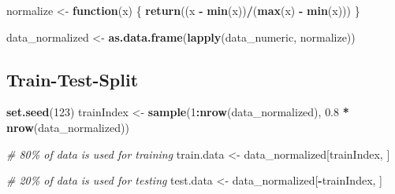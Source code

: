 \documentclass[
  10pt,
  paper=a4,
  ,captions=tableheading
]{scrartcl}
\newenvironment{Shaded}{\begin{snugshade}}{\end{snugshade}}
\newcommand{\CommentTok}[1]{\textcolor[rgb]{0.56,0.35,0.01}{\textit{#1}}}
\newcommand{\ControlFlowTok}[1]{\textcolor[rgb]{0.13,0.29,0.53}{\textbf{#1}}}
\newcommand{\DecValTok}[1]{\textcolor[rgb]{0.00,0.00,0.81}{#1}}
\newcommand{\FloatTok}[1]{\textcolor[rgb]{0.00,0.00,0.81}{#1}}
\newcommand{\FunctionTok}[1]{\textcolor[rgb]{0.13,0.29,0.53}{\textbf{#1}}}
\newcommand{\NormalTok}[1]{#1}
\newcommand{\OtherTok}[1]{\textcolor[rgb]{0.56,0.35,0.01}{#1}}
\newcommand{\SpecialCharTok}[1]{\textcolor[rgb]{0.81,0.36,0.00}{\textbf{#1}}}
\newcommand{\StringTok}[1]{\textcolor[rgb]{0.31,0.60,0.02}{#1}}
\begin{document}
\begin{Shaded}
\begin{Highlighting}[]
\NormalTok{normalize }\OtherTok{\textless{}{-}} \ControlFlowTok{function}\NormalTok{(x) \{}
    \FunctionTok{return}\NormalTok{((x }\SpecialCharTok{{-}} \FunctionTok{min}\NormalTok{(x))}\SpecialCharTok{/}\NormalTok{(}\FunctionTok{max}\NormalTok{(x) }\SpecialCharTok{{-}} \FunctionTok{min}\NormalTok{(x)))}
\NormalTok{\}}

\NormalTok{data\_normalized }\OtherTok{\textless{}{-}} \FunctionTok{as.data.frame}\NormalTok{(}\FunctionTok{lapply}\NormalTok{(data\_numeric, normalize))}
\end{Highlighting}
\end{Shaded}

\small

\subsection{Train-Test-Split}\label{train-test-split}

\small

\begin{Shaded}
\begin{Highlighting}[]
\FunctionTok{set.seed}\NormalTok{(}\DecValTok{123}\NormalTok{)}
\NormalTok{trainIndex }\OtherTok{\textless{}{-}} \FunctionTok{sample}\NormalTok{(}\DecValTok{1}\SpecialCharTok{:}\FunctionTok{nrow}\NormalTok{(data\_normalized), }\FloatTok{0.8} \SpecialCharTok{*} \FunctionTok{nrow}\NormalTok{(data\_normalized))}

\CommentTok{\# 80\% of data is used for training}
\NormalTok{train.data }\OtherTok{\textless{}{-}}\NormalTok{ data\_normalized[trainIndex, ]}

\CommentTok{\# 20\% of data is used for testing}
\NormalTok{test.data }\OtherTok{\textless{}{-}}\NormalTok{ data\_normalized[}\SpecialCharTok{{-}}\NormalTok{trainIndex, ]}
\end{Highlighting}
\end{Shaded}

\small

\small

\begin{Shaded}
\end{Shaded}
\end{document}
